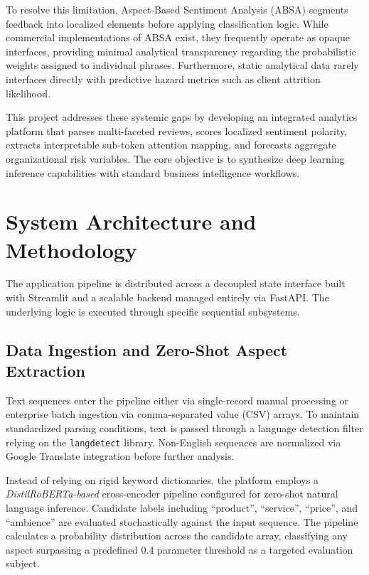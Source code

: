 \documentclass[conference]{IEEEtran}
\begin{document}
To resolve this limitation, Aspect-Based Sentiment Analysis (ABSA) segments feedback into localized elements before applying classification logic. While commercial implementations of ABSA exist, they frequently operate as opaque interfaces, providing minimal analytical transparency regarding the probabilistic weights assigned to individual phrases. Furthermore, static analytical data rarely interfaces directly with predictive hazard metrics such as client attrition likelihood.

This project addresses these systemic gaps by developing an integrated analytics platform that parses multi-faceted reviews, scores localized sentiment polarity, extracts interpretable sub-token attention mapping, and forecasts aggregate organizational risk variables. The core objective is to synthesize deep learning inference capabilities with standard business intelligence workflows.

\section{System Architecture and Methodology}
The application pipeline is distributed across a decoupled state interface built with Streamlit and a scalable backend managed entirely via FastAPI. The underlying logic is executed through specific sequential subsystems.

\subsection{Data Ingestion and Zero-Shot Aspect Extraction}
Text sequences enter the pipeline either via single-record manual processing or enterprise batch ingestion via comma-separated value (CSV) arrays. To maintain standardized parsing conditions, text is passed through a language detection filter relying on the \texttt{langdetect} library. Non-English sequences are normalized via Google Translate integration before further analysis.

Instead of relying on rigid keyword dictionaries, the platform employs a \textit{DistilRoBERTa-based} cross-encoder pipeline configured for zero-shot natural language inference. Candidate labels including ``product'', ``service'', ``price'', and ``ambience'' are evaluated stochastically against the input sequence. The pipeline calculates a probability distribution across the candidate array, classifying any aspect surpassing a predefined 0.4 parameter threshold as a targeted evaluation subject.
\end{document}
